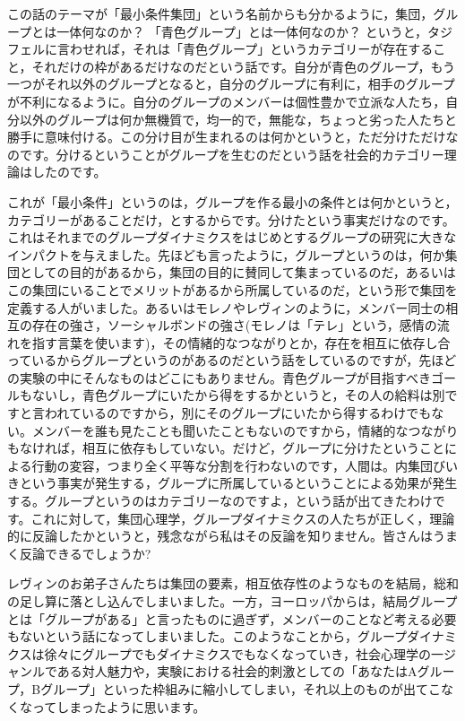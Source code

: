 \documentclass{ltjsbook}
\begin{document}
この話のテーマが「最小条件集団」という名前からも分かるように，集団，グループとは一体何なのか？ 「青色グループ」とは一体何なのか？ というと，タジフェルに言わせれば，それは「青色グループ」というカテゴリーが存在すること，それだけの枠があるだけなのだという話です。自分が青色のグループ，もう一つがそれ以外のグループとなると，自分のグループに有利に，相手のグループが不利になるように。自分のグループのメンバーは個性豊かで立派な人たち，自分以外のグループは何か無機質で，均一的で，無能な，ちょっと劣った人たちと勝手に意味付ける。この分け目が生まれるのは何かというと，ただ分けただけなのです。分けるということがグループを生むのだという話を社会的カテゴリー理論はしたのです。

これが「最小条件」というのは，グループを作る最小の条件とは何かというと，カテゴリーがあることだけ，とするからです。分けたという事実だけなのです。これはそれまでのグループダイナミクスをはじめとするグループの研究に大きなインパクトを与えました。先ほども言ったように，グループというのは，何か集団としての目的があるから，集団の目的に賛同して集まっているのだ，あるいはこの集団にいることでメリットがあるから所属しているのだ，という形で集団を定義する人がいました。あるいはモレノやレヴィンのように，メンバー同士の相互の存在の強さ，ソーシャルボンドの強さ(モレノは「テレ」という，感情の流れを指す言葉を使います)，その情緒的なつながりとか，存在を相互に依存し合っているからグループというのがあるのだという話をしているのですが，先ほどの実験の中にそんなものはどこにもありません。青色グループが目指すべきゴールもないし，青色グループにいたから得をするかというと，その人の給料は別ですと言われているのですから，別にそのグループにいたから得するわけでもない。メンバーを誰も見たことも聞いたこともないのですから，情緒的なつながりもなければ，相互に依存もしていない。だけど，グループに分けたということによる行動の変容，つまり全く平等な分割を行わないのです，人間は。内集団びいきという事実が発生する，グループに所属しているということによる効果が発生する。グループというのはカテゴリーなのですよ，という話が出てきたわけです。これに対して，集団心理学，グループダイナミクスの人たちが正しく，理論的に反論したかというと，残念ながら私はその反論を知りません。皆さんはうまく反論できるでしょうか?

レヴィンのお弟子さんたちは集団の要素，相互依存性のようなものを結局，総和の足し算に落とし込んでしまいました。一方，ヨーロッパからは，結局グループとは「グループがある」と言ったものに過ぎず，メンバーのことなど考える必要もないという話になってしまいました。このようなことから，グループダイナミクスは徐々にグループでもダイナミクスでもなくなっていき，社会心理学の一ジャンルである対人魅力や，実験における社会的刺激としての「あなたはAグループ，Bグループ」といった枠組みに縮小してしまい，それ以上のものが出てこなくなってしまったように思います。
\end{document}

